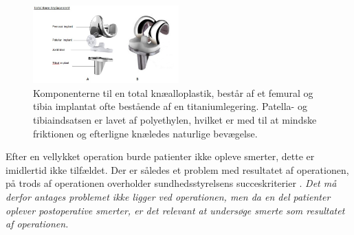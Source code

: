 \begin{figure}[H] 
	\begin{center}
		\includegraphics[width=0.5\textwidth]{../figures/tka_implant}
	\end{center}
	\caption{Komponenterne til en total knæalloplastik, består af et femural og tibia implantat ofte bestående af en titaniumlegering. Patella- og tibiaindsatsen er lavet af polyethylen, hvilket er med til at mindske friktionen og efterligne knæledes naturlige bevægelse.\citep{1}} 
	\label{fig:tka_implant} 
\end{figure}

Efter en vellykket operation burde patienter ikke opleve smerter, dette er imidlertid ikke tilfældet. Der er således et problem med resultatet af operationen, på trods af operationen overholder sundhedsstyrelsens succeskriterier \citep{aarsrapport2016}.\textit{ Det må derfor antages problemet ikke ligger ved operationen, men da en del patienter oplever postoperative smerter, er det relevant at undersøge smerte som resultatet af operationen. }

